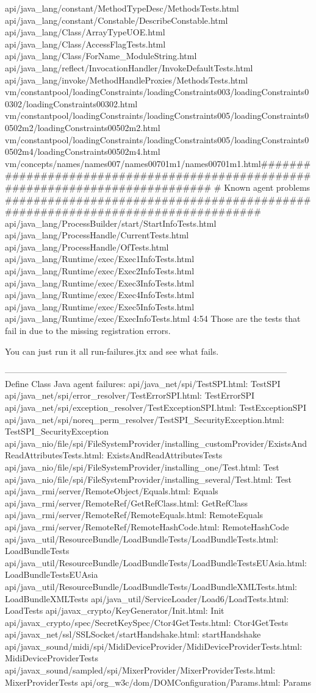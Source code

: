 api/java_lang/constant/MethodTypeDesc/MethodsTests.html
api/java_lang/constant/Constable/DescribeConstable.html
api/java_lang/Class/ArrayTypeUOE.html
api/java_lang/Class/AccessFlagTests.html
api/java_lang/Class/ForName_ModuleString.html
api/java_lang/reflect/InvocationHandler/InvokeDefaultTests.html
api/java_lang/invoke/MethodHandleProxies/MethodsTests.html
vm/constantpool/loadingConstraints/loadingConstraints003/loadingConstraints00302/loadingConstraints00302.html
vm/constantpool/loadingConstraints/loadingConstraints005/loadingConstraints00502m2/loadingConstraints00502m2.html
vm/constantpool/loadingConstraints/loadingConstraints005/loadingConstraints00502m4/loadingConstraints00502m4.html
vm/concepts/names/names007/names00701m1/names00701m1.html###############################################################################
# Known agent problems
###############################################################################
api/java_lang/ProcessBuilder/start/StartInfoTests.html
api/java_lang/ProcessHandle/CurrentTests.html
api/java_lang/ProcessHandle/OfTests.html
api/java_lang/Runtime/exec/Exec1InfoTests.html
api/java_lang/Runtime/exec/Exec2InfoTests.html
api/java_lang/Runtime/exec/Exec3InfoTests.html
api/java_lang/Runtime/exec/Exec4InfoTests.html
api/java_lang/Runtime/exec/Exec5InfoTests.html
api/java_lang/Runtime/exec/ExecInfoTests.html
4:54
Those are the tests that fail in due to the missing registration errors.


You can just run it all run-failures.jtx and see what fails.



---------------------------------------------------------------------------------------------------
Define Class Java agent failures:
api/java_net/spi/TestSPI.html: TestSPI
api/java_net/spi/error_resolver/TestErrorSPI.html: TestErrorSPI
api/java_net/spi/exception_resolver/TestExceptionSPI.html: TestExceptionSPI
api/java_net/spi/noreq_perm_resolver/TestSPI_SecurityException.html: TestSPI_SecurityException
api/java_nio/file/spi/FileSystemProvider/installing_customProvider/ExistsAndReadAttributesTests.html: ExistsAndReadAttributesTests
api/java_nio/file/spi/FileSystemProvider/installing_one/Test.html: Test
api/java_nio/file/spi/FileSystemProvider/installing_several/Test.html: Test
api/java_rmi/server/RemoteObject/Equals.html: Equals
api/java_rmi/server/RemoteRef/GetRefClass.html: GetRefClass
api/java_rmi/server/RemoteRef/RemoteEquals.html: RemoteEquals
api/java_rmi/server/RemoteRef/RemoteHashCode.html: RemoteHashCode
api/java_util/ResourceBundle/LoadBundleTests/LoadBundleTests.html: LoadBundleTests
api/java_util/ResourceBundle/LoadBundleTests/LoadBundleTestsEUAsia.html: LoadBundleTestsEUAsia
api/java_util/ResourceBundle/LoadBundleTests/LoadBundleXMLTests.html: LoadBundleXMLTests
api/java_util/ServiceLoader/Load6/LoadTests.html: LoadTests
api/javax_crypto/KeyGenerator/Init.html: Init
api/javax_crypto/spec/SecretKeySpec/Ctor4GetTests.html: Ctor4GetTests
api/javax_net/ssl/SSLSocket/startHandshake.html: startHandshake
api/javax_sound/midi/spi/MidiDeviceProvider/MidiDeviceProviderTests.html: MidiDeviceProviderTests
api/javax_sound/sampled/spi/MixerProvider/MixerProviderTests.html: MixerProviderTests
api/org_w3c/dom/DOMConfiguration/Params.html: Params 

